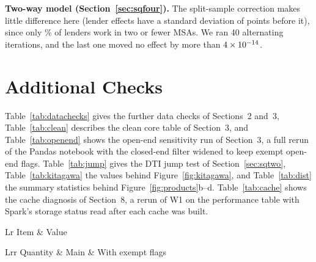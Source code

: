 \documentclass[acmtog,nonacm]{acmart}
\begin{document}
\textbf{Two-way model (Section~\ref{sec:sqfour}).}\label{app:lenders} The split-sample correction makes little difference here (lender effects have a standard deviation of \twLenderFullSD{} points before it), since only \twLeTwoShare\% of lenders work in two or fewer MSAs. We ran 40 alternating iterations, and the last one moved no effect by more than $4\times10^{-14}$.





\section{Additional Checks}\label{app:checks}

Table~\ref{tab:datachecks} gives the further data checks of Sections~2 and~3, Table~\ref{tab:clean} describes the clean core table of Section~3, and Table~\ref{tab:openend} shows the open-end sensitivity run of Section~3, a full rerun of the Pandas notebook with the closed-end filter widened to keep exempt open-end flags. Table~\ref{tab:jump} gives the DTI jump test of Section~\ref{sec:sqtwo}, Table~\ref{tab:kitagawa} the values behind Figure~\ref{fig:kitagawa}, and Table~\ref{tab:dist} the summary statistics behind Figure~\ref{fig:products}b--d. Table~\ref{tab:cache} shows the cache diagnosis of Section~8, a rerun of W1 on the performance table with Spark's storage status read after each cache was built.

\begin{table}[p]
\begin{minipage}[t]{0.47\textwidth}
\caption{Clean core table kept as a notebook output; rows per state and column types are in \texttt{results/clean/}.}\label{tab:clean}
\footnotesize
\setlength{\tabcolsep}{3pt}
\begin{tabularx}{\linewidth}{Lr}
\toprule
Item & Value \\
\midrule
{}
\bottomrule
\end{tabularx}
\end{minipage}\hfill
\begin{minipage}[t]{0.47\textwidth}
\caption{Sensitivity to records whose open-end flag is exempt (gaps and jumps in percentage points).}\label{tab:openend}
\footnotesize
\setlength{\tabcolsep}{3pt}
\begin{tabularx}{\linewidth}{Lrr}
\toprule
Quantity & Main & With exempt flags \\
\midrule
{}
\bottomrule
\end{tabularx}
\end{minipage}
\end{table}
\end{document}
